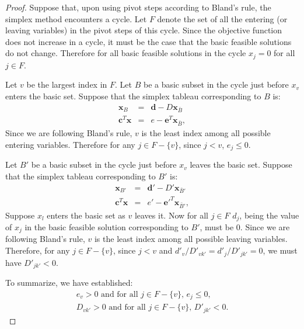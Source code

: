 \documentclass{amsbook}
\newcommand{\xx}{\mathbf x}
\newcommand{\cc}{\mathbf c}
\theoremstyle{definition}
\theoremstyle{remark}
\begin{document}
\begin{proof}
  Suppose that, upon using pivot steps according to Bland's rule, the simplex method encounters a cycle.
  Let $F$ denote the set of all the entering (or leaving variables) in the pivot steps of this cycle.
  Since the objective function does not increase in a cycle, it must be the case that the basic feasible solutions do not change.
  Therefore for all basic feasible solutions in the cycle $x_j=0$ for all $j\in F$.
  
  Let $v$ be the largest index in $F$.
  Let $B$ be a basic subset in the cycle just before $x_v$ enters the basic set.
  Suppose that the simplex tableau corresponding to $B$ is:
  \begin{displaymath}
      \begin{matrix}
    \xx_B & = & \mathbf d - D\xx_{\bar B}\\
    \hline
    \cc^T\xx & = & e - \mathbf e^T \xx_{\bar B},
  \end{matrix}
  \end{displaymath}
  Since we are following Bland's rule, $v$ is the least index among all possible entering variables.
  Therefore for any $j\in F-\{v\}$, since $j<v$, $e_j\leq 0$.

  Let $B'$ be a basic subset in the cycle just before $x_v$ leaves the basic set.
  Suppose that the simplex tableau corresponding to $B'$ is:
  \begin{displaymath}
    \begin{matrix}
      \xx_{B'} & = & \mathbf d' - D'\xx_{\bar B'}\\
      \hline
      \cc^T\xx & = & e' - \mathbf {e'}^T \xx_{\bar B'},
    \end{matrix}
  \end{displaymath}
  Suppose $x_l$ enters the basic set as $v$ leaves it.
  Now for all $j\in F$ $d_j$, being the value of $x_j$ in the basic feasible solution corresponding to $B'$, must be $0$.
  Since we are following Bland's rule, $v$ is the least index among all possible leaving variables.
  Therefore, for any $j\in F-\{v\}$, since $j<v$ and $d'_v/D'_{vk'}=d'_j/D'_{jk'}=0$, we must have $D'_{jk'}<0$.

  To summarize, we have established:
  \begin{gather}
    \label{eq:cycle1}
    \text{$e_v>0$ and for all $j\in F-\{v\}$, $e_j\leq 0$},\\
    \label{eq:cycle2}
    \text{$D_{vk'}>0$ and for all $j\in F-\{v\}$, $D'_{jk'}<0$}.
  \end{gather}


\end{proof}
\end{document}
